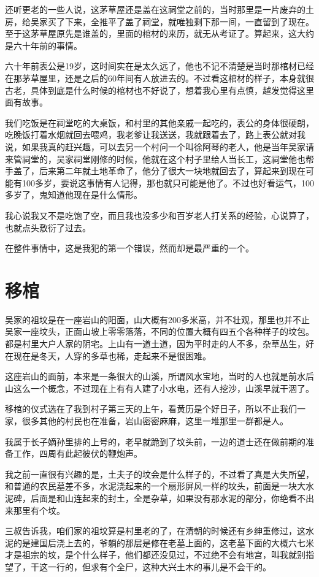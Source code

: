 还听更老的一些人说，这茅草屋还是盖在这祠堂之前的，当时那里是一片废弃的土房，给吴家买了下来，全推平了盖了祠堂，就唯独剩下那一间，一直留到了现在。至于这茅草屋原先是谁盖的，里面的棺材的来历，就无从考证了。算起来，这大约是六十年前的事情。

六十年前表公是19岁，这时间实在是太久远了，他也不记不清楚是当时那棺材已经在那茅草屋里，还是之后的60年间有人放进去的。不过看这棺材的样子，本身就很古老，具体到底是什么时候的棺材也不好说了，想着我心里有点慎，越发觉得这里面有故事。

我们吃饭是在祠堂吃的大桌饭，和村里的其他亲戚一起吃的，表公的身体很硬朗，吃晚饭打着水烟就回去喂鸡，我老爹让我送送，我就跟着去了，路上表公就对我说，如果我真的赶兴趣，可以去另一个村问一个叫徐阿琴的老人，他是当年吴家请来管祠堂的，吴家祠堂刚修的时候，他就在这个村子里给人当长工，这祠堂他也帮手盖了，后来第二年就土地革命了，他分了很大一块地就回去了，算起来到现在可能有100多岁，要说这事情有人记得，那也就只可能是他了。不过也好看运气，100多岁了，鬼知道他现在是什么情形。

我心说我又不是吃饱了空，而且我也没多少和百岁老人打关系的经验，心说算了，也就点头敷衍了过去。

在整件事情中，这是我犯的第一个错误，然而却是最严重的一个。

\chapter{移棺}

吴家的祖坟是在一座岩山的阳面，山大概有200多米高，并不壮观，那里也并不止吴家一座坟头，正面山坡上零零落落，不同的位置大概有四五个各种样子的坟包。都是村里大户人家的阴宅。上山有一道土道，因为平时走的人不多，杂草丛生，好在现在是冬天，人穿的多草也稀，走起来不是很困难。

这座岩山的面前，本来是一条很大的山溪，所谓风水宝地，当时的人也就是前水后山这么一个概念，不过现在上有有人建了小水电，还有人挖沙，山溪早就干涸了。

移棺的仪式选在了我到村子第三天的上午，看黄历是个好日子，所以不止我们一家，很多其他的村民也在准备，岩山密密麻麻，这里一堆那里一群都是人。

我属于长子嫡孙里排的上号的，老早就跪到了坟头前，一边的道士还在做前期的准备工作，四周有此起彼伏的鞭炮声。

我之前一直很有兴趣的是，土夫子的坟会是什么样子的，不过看了真是大失所望，和普通的农民墓差不多，水泥浇起来的一个扇形屏风一样的坟头，前面是一块大水泥碑，后面是和山连起来的封土，全是杂草，如果没有那水泥的部分，你绝看不出来那里有个坟。

三叔告诉我，咱们家的祖坟算是村里老的了，在清朝的时候还有乡绅重修过，这水泥的是建国后浇上去的，爷躺的那层是修在老墓上面的，这老墓下面的大概六七米才是祖宗的坟，是个什么样子，他们都还没见过，不过绝不会有地宫，叫我就别指望了，干这一行的，但求有个全尸，这种大兴土木的事儿是不会干的。

